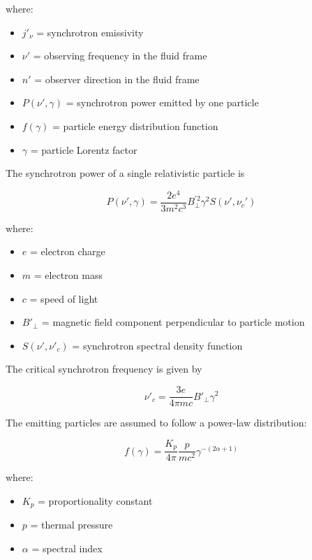 \documentclass{article}
\begin{document}
where:

\begin{itemize}
\item $j'_{\nu}$ = synchrotron emissivity
\item $\nu'$ = observing frequency in the fluid frame
\item $n'$ = observer direction in the fluid frame
\item $P(\nu',\gamma)$ = synchrotron power emitted by one particle
\item $f(\gamma)$ = particle energy distribution function
\item $\gamma$ = particle Lorentz factor
\end{itemize}

The synchrotron power of a single relativistic particle is

\begin{equation}
P(\nu',\gamma)
=
\frac{2e^4}{3m^2c^3}
B_{\perp}^{\prime 2}
\gamma^2
S(\nu',\nu_c')
\end{equation}

where:

\begin{itemize}
\item $e$ = electron charge
\item $m$ = electron mass
\item $c$ = speed of light
\item $B'_{\perp}$ = magnetic field component perpendicular to particle motion
\item $S(\nu',\nu'_c)$ = synchrotron spectral density function
\end{itemize}

The critical synchrotron frequency is given by

\begin{equation}
\nu'_c
=
\frac{3e}{4\pi mc}
B'_{\perp}\gamma^2
\end{equation}

The emitting particles are assumed to follow a power-law distribution:

\begin{equation}
f(\gamma)
=
\frac{K_p}{4\pi}
\frac{p}{mc^2}
\gamma^{-(2\alpha+1)}
\end{equation}

where:

\begin{itemize}
\item $K_p$ = proportionality constant
\item $p$ = thermal pressure
\item $\alpha$ = spectral index
\end{itemize}
\end{document}

